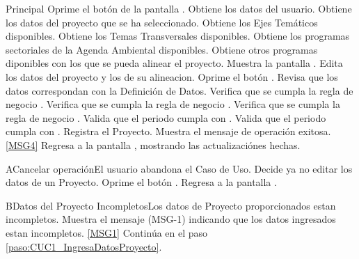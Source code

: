 	\begin{UCtrayectoria}{Principal}
			\UCpaso[\UCactor] Oprime el botón  de la pantalla .
			\UCpaso Obtiene los datos del usuario.\label{paso:CUC1_ObtieneDatosUsuario}
			\UCpaso Obtiene los datos del proyecto que se ha seleccionado.
			\UCpaso Obtiene los Ejes Temáticos disponibles.
			\UCpaso Obtiene los Temas Transversales disponibles.
			\UCpaso Obtiene los programas sectoriales de la Agenda Ambiental disponibles.
			\UCpaso Obtiene otros programas diponibles con los que se pueda alinear el proyecto.
			\UCpaso Muestra la pantalla .
			\UCpaso [\UCactor] Edita los datos del proyecto y los de su alineacion.\label{paso:CUC1_IngresaDatosProyecto} 
			\UCpaso [\UCactor] Oprime el botón .\label{paso:CUC1_OprimeAceptar}
			\UCpaso Revisa que los datos correspondan con la Definición de Datos.  
			\UCpaso Verifica que se cumpla la regla de negocio .
			\UCpaso Verifica que se cumpla la regla de negocio .
			\UCpaso Verifica que se cumpla la regla de negocio .
			\UCpaso Valida que el periodo cumpla con   .
			\UCpaso Valida que el periodo cumpla con   .
			\UCpaso Registra el Proyecto.
			\UCpaso Muestra el mensaje de operación exitosa. \ref{MSG4}
			\UCpaso Regresa a la pantalla , mostrando las actualizaciónes hechas.
	\end{UCtrayectoria}

	\begin{UCtrayectoriaA}{A}{Cancelar operación}{El usuario abandona el Caso de Uso.}
			\UCpaso[\UCactor] Decide ya no editar los datos de un Proyecto.
			\UCpaso[\UCactor] Oprime el botón .
			\UCpaso Regresa a la pantalla .
	\end{UCtrayectoriaA}


	\begin{UCtrayectoriaA}{B}{Datos del Proyecto Incompletos}{Los datos de Proyecto proporcionados estan incompletos.}
			\UCpaso Muestra el mensaje (MSG-1) indicando que los datos ingresados estan incompletos. \ref{MSG1}
			\UCpaso Continúa en el paso \ref{paso:CUC1_IngresaDatosProyecto}.
	\end{UCtrayectoriaA}

